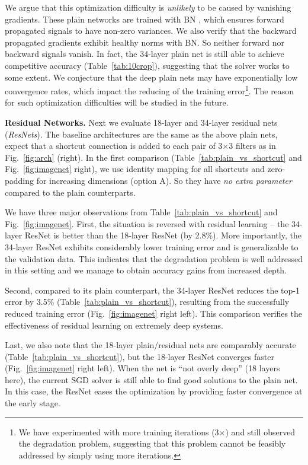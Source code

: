 \documentclass[10pt,twocolumn,letterpaper]{article}
\begin{document}
We argue that this optimization difficulty is \emph{unlikely} to be caused by vanishing gradients. These plain networks are trained with BN \cite{Ioffe2015}, which ensures forward propagated signals to have non-zero variances. We also verify that the backward propagated gradients exhibit healthy norms with BN. So neither forward nor backward signals vanish.
In fact, the 34-layer plain net is still able to achieve competitive accuracy (Table~\ref{tab:10crop}), suggesting that the solver works to some extent. We conjecture that the deep plain nets may have exponentially low convergence rates, which impact the reducing of the training error\footnote{We have experimented with more training iterations (3$\times$) and still observed the degradation problem, suggesting that this problem cannot be feasibly addressed by simply using more iterations.}.
The reason for such optimization difficulties will be studied in the future.

\vspace{6pt}
\noindent\textbf{Residual Networks.}
Next we evaluate 18-layer and 34-layer residual nets (\emph{ResNets}). The baseline architectures are the same as the above plain nets, expect that a shortcut connection is added to each pair of 3$\times$3 filters as in Fig.~\ref{fig:arch} (right). In the first comparison (Table~\ref{tab:plain_vs_shortcut} and Fig.~\ref{fig:imagenet} right), we use identity mapping for all shortcuts and zero-padding for increasing dimensions (option A). So they have \emph{no extra parameter} compared to the plain counterparts.

We have three major observations from Table~\ref{tab:plain_vs_shortcut} and Fig.~\ref{fig:imagenet}. First, the situation is reversed with residual learning -- the 34-layer ResNet is better than the 18-layer ResNet (by 2.8\%). More importantly, the 34-layer ResNet exhibits considerably lower training error and is generalizable to the validation data. This indicates that the degradation problem is well addressed in this setting and we manage to obtain accuracy gains from increased depth.

Second, compared to its plain counterpart, the 34-layer ResNet reduces the top-1 error by 3.5\% (Table~\ref{tab:plain_vs_shortcut}), resulting from the successfully reduced training error (Fig.~\ref{fig:imagenet} right \vs left). This comparison verifies the effectiveness of residual learning on extremely deep systems.

Last, we also note that the 18-layer plain/residual nets are comparably accurate (Table~\ref{tab:plain_vs_shortcut}), but the 18-layer ResNet converges faster (Fig.~\ref{fig:imagenet} right \vs left).
When the net is ``not overly deep'' (18 layers here), the current SGD solver is still able to find good solutions to the plain net. In this case, the ResNet eases the optimization by providing faster convergence at the early stage.
\end{document}
